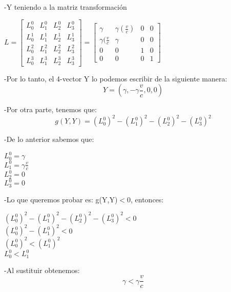 \documentclass[a4paper, 11pt]{article}
\begin{document}
-Y teniendo a la matriz transformación\\ 
\begin{center}
$L=
\begin{bmatrix}{L_{0}^{0}}&{L_{1}^{0}}&{L_{2}^{0}}&{L_{3}^{0}}\\{L_{0}^{1}}&{L_{1}^{1}}&{L_{2}^{1}}&{L_{3}^{1}}\\{L_{0}^{2}}&{L_{1}^{2}}&{L_{2}^{2}}&{L_{3}^{2}}\\{L_{0}^{3}}&{L_{1}^{3}}&{L_{2}^{3}}&{L_{3}^{3}}\end{bmatrix} =
\begin{bmatrix}{\gamma}&{\gamma(\frac{v}{c})}&{0}&{0}\\{\gamma(\frac{v}{c}}&{\gamma}&{0}&{0}\\{0}&{0}&{1}&{0}\\{0}&{0}&{0}&{1}\end{bmatrix}$\\
\end{center}

-Por lo tanto, el 4-vector Y lo podemos escribir de la siguiente manera:
\begin{equation}
Y=(\gamma,-\gamma\frac{v}{c},0,0)
\end{equation}

-Por otra parte, tenemos que:
\begin{equation}
    g(Y,Y)=(L_{0}^{0})^2 - (L_{1}^{0})^2 - (L_{2}^{0})^2 - (L_{3}^{0})^2
\end{equation}

-De lo anterior sabemos que:
\begin{center}
    $L_{0}^{0}=\gamma$\\
    $L_{1}^{0}=\gamma\frac{v}{c}$\\
    $L_{2}^{0}=0$\\
    $L_{3}^{0}=0$\\
\end{center}

-Lo que queremos probar es: g(Y,Y)$<$0, entonces:
\begin{center}
    $(L_{0}^{0})^2-(L_{1}^{0})^2-(L_{2}^{0})^2-(L_{3}^{0})^2<$0\\ 
    $(L_{0}^{0})^2 - (L_{1}^{0})^2<$0\\
    $(L_{0}^{0})^2 < (L_{1}^{0})^2$\\
    $L_{0}^{0} < L_{1}^{0}$
\end{center}

-Al sustituir obtenemos:
\begin{equation}
    \gamma<\gamma\frac{v}{c}
\end{equation}
\end{document}
